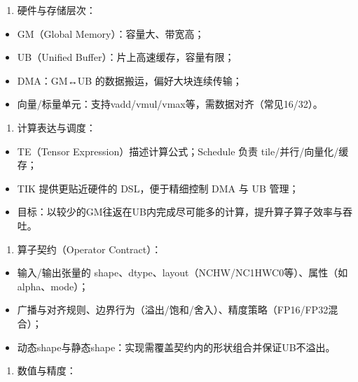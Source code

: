 \begin{enumerate}
\def\labelenumi{\arabic{enumi})}
\tightlist
\item
  硬件与存储层次：
\end{enumerate}

\begin{itemize}
\tightlist
\item
  GM（Global Memory）：容量大、带宽高；
\item
  UB（Unified Buffer）：片上高速缓存，容量有限；
\item
  DMA：GM↔UB 的数据搬运，偏好大块连续传输；
\item
  向量/标量单元：支持vadd/vmul/vmax等，需数据对齐（常见16/32）。
\end{itemize}

\begin{enumerate}
\def\labelenumi{\arabic{enumi})}
\setcounter{enumi}{1}
\tightlist
\item
  计算表达与调度：
\end{enumerate}

\begin{itemize}
\tightlist
\item
  TE（Tensor Expression）描述计算公式；Schedule 负责
  tile/并行/向量化/缓存；
\item
  TIK 提供更贴近硬件的 DSL，便于精细控制 DMA 与 UB 管理；
\item
  目标：以较少的GM往返在UB内完成尽可能多的计算，提升算子算子效率与吞吐。
\end{itemize}

\begin{enumerate}
\def\labelenumi{\arabic{enumi})}
\setcounter{enumi}{2}
\tightlist
\item
  算子契约（Operator Contract）：
\end{enumerate}

\begin{itemize}
\tightlist
\item
  输入/输出张量的
  shape、dtype、layout（NCHW/NC1HWC0等）、属性（如alpha、mode）；
\item
  广播与对齐规则、边界行为（溢出/饱和/舍入）、精度策略（FP16/FP32混合）；
\item
  动态shape与静态shape：实现需覆盖契约内的形状组合并保证UB不溢出。
\end{itemize}

\begin{enumerate}
\def\labelenumi{\arabic{enumi})}
\setcounter{enumi}{3}
\tightlist
\item
  数值与精度：
\end{enumerate}

